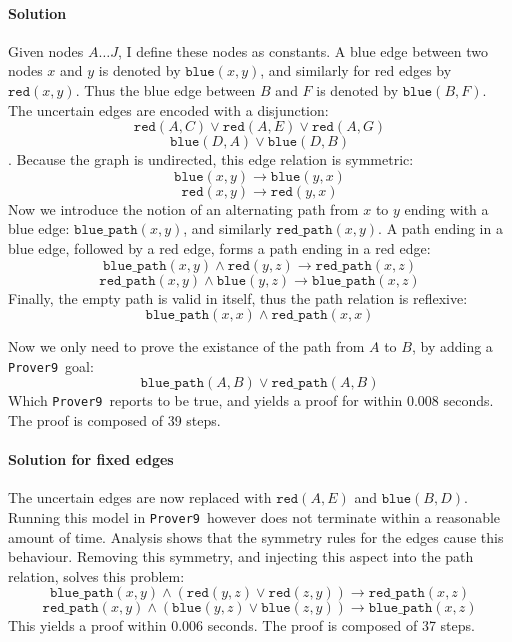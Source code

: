 \documentclass[12pt]{article}
\newcommand{\bimp}{\rightarrow}
\newcommand{\band}{\wedge}
\newcommand{\bor}{\vee}
\newcommand{\provernine}{\texttt{Prover9}~}
\newcommand{\blue}[2]{\mathtt{blue}(#1, #2)}
\newcommand{\red}[2]{\mathtt{red}(#1, #2)}
\newcommand{\bluep}[2]{\mathtt{blue\_path}(#1, #2)}
\newcommand{\redp}[2]{\mathtt{red\_path}(#1, #2)}
\begin{document}
\paragraph{Solution}
Given nodes $A \ldots J$, I define these nodes as constants.
A blue edge between two nodes $x$ and $y$ is denoted by $\blue{x}{y}$,
and similarly for red edges by $\red{x}{y}$.
Thus the blue edge between $B$ and $F$ is denoted by $\blue{B}{F}$.
The uncertain edges are encoded with a disjunction:
\[ \red{A}{C} \bor \red{A}{E} \bor \red{A}{G} \]
\[ \blue{D}{A} \bor \blue{D}{B} \].
Because the graph is undirected, this edge relation is symmetric:
\[ \blue{x}{y} \bimp \blue{y}{x} \]
\[ \red{x}{y} \bimp \red{y}{x} \]
Now we introduce the notion of an alternating path from $x$ to $y$ ending with a blue edge:
$\bluep{x}{y}$, and similarly $\redp{x}{y}$.
A path ending in a blue edge, followed by a red edge, forms a path ending in a red edge:
\[ \bluep{x}{y} \band \red{y}{z} \bimp \redp{x}{z} \]
\[ \redp{x}{y} \band \blue{y}{z} \bimp \bluep{x}{z} \]
Finally, the empty path is valid in itself, thus the path relation is reflexive:
\[ \bluep{x}{x} \band \redp{x}{x} \]

Now we only need to prove the existance of the path from $A$ to $B$, by adding
a \provernine goal:
\[ \bluep{A}{B} \bor \redp{A}{B} \]
Which \provernine reports to be true, and yields a proof for within 0.008 seconds.
The proof is composed of 39 steps.

\paragraph{Solution for fixed edges}
The uncertain edges are now replaced with $\red{A}{E}$ and $\blue{B}{D}$.
Running this model in \provernine however does not terminate within a reasonable amount of time.
Analysis shows that the symmetry rules for the edges cause this behaviour.
Removing this symmetry, and injecting this aspect into the path relation, solves this problem:
\[ \bluep{x}{y} \band (\red{y}{z} \bor \red{z}{y}) \bimp \redp{x}{z} \]
\[ \redp{x}{y} \band (\blue{y}{z} \bor \blue{z}{y}) \bimp \bluep{x}{z} \]
This yields a proof within 0.006 seconds.
The proof is composed of 37 steps.
\end{document}
